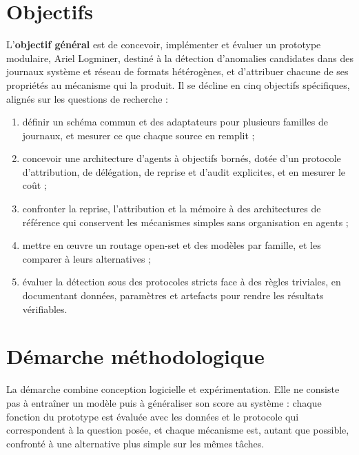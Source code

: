 \section*{Objectifs}


L'\textbf{objectif général} est de concevoir, implémenter et évaluer un prototype modulaire, Ariel Logminer, destiné à la détection d'anomalies candidates dans des journaux système et réseau de formats hétérogènes, et d'attribuer chacune de ses propriétés au mécanisme qui la produit. Il se décline en cinq objectifs spécifiques, alignés sur les questions de recherche :
\begin{enumerate}
    \item définir un schéma commun et des adaptateurs pour plusieurs familles de journaux, et mesurer ce que chaque source en remplit ;
    \item concevoir une architecture d'agents à objectifs bornés, dotée d'un protocole d'attribution, de délégation, de reprise et d'audit explicites, et en mesurer le coût ;
    \item confronter la reprise, l'attribution et la mémoire à des architectures de référence qui conservent les mécanismes simples sans organisation en agents ;
    \item mettre en œuvre un routage open-set et des modèles par famille, et les comparer à leurs alternatives ;
    \item évaluer la détection sous des protocoles stricts face à des règles triviales, en documentant données, paramètres et artefacts pour rendre les résultats vérifiables.
\end{enumerate}


\section*{Démarche méthodologique}


La démarche combine conception logicielle et expérimentation. Elle ne consiste pas à entraîner un modèle puis à généraliser son score au système : chaque fonction du prototype est évaluée avec les données et le protocole qui correspondent à la question posée, et chaque mécanisme est, autant que possible, confronté à une alternative plus simple sur les mêmes tâches.

